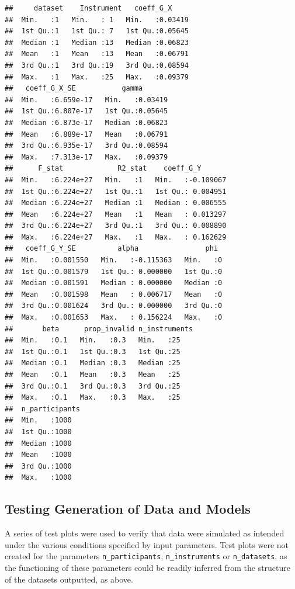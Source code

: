 \documentclass[
]{article}
\begin{document}
\begin{verbatim}
##     dataset    Instrument   coeff_G_X      
##  Min.   :1   Min.   : 1   Min.   :0.03419  
##  1st Qu.:1   1st Qu.: 7   1st Qu.:0.05645  
##  Median :1   Median :13   Median :0.06823  
##  Mean   :1   Mean   :13   Mean   :0.06791  
##  3rd Qu.:1   3rd Qu.:19   3rd Qu.:0.08594  
##  Max.   :1   Max.   :25   Max.   :0.09379  
##   coeff_G_X_SE           gamma        
##  Min.   :6.659e-17   Min.   :0.03419  
##  1st Qu.:6.807e-17   1st Qu.:0.05645  
##  Median :6.873e-17   Median :0.06823  
##  Mean   :6.889e-17   Mean   :0.06791  
##  3rd Qu.:6.935e-17   3rd Qu.:0.08594  
##  Max.   :7.313e-17   Max.   :0.09379  
##      F_stat             R2_stat    coeff_G_Y        
##  Min.   :6.224e+27   Min.   :1   Min.   :-0.109067  
##  1st Qu.:6.224e+27   1st Qu.:1   1st Qu.: 0.004951  
##  Median :6.224e+27   Median :1   Median : 0.006555  
##  Mean   :6.224e+27   Mean   :1   Mean   : 0.013297  
##  3rd Qu.:6.224e+27   3rd Qu.:1   3rd Qu.: 0.008890  
##  Max.   :6.224e+27   Max.   :1   Max.   : 0.162629  
##   coeff_G_Y_SE          alpha                phi   
##  Min.   :0.001550   Min.   :-0.115363   Min.   :0  
##  1st Qu.:0.001579   1st Qu.: 0.000000   1st Qu.:0  
##  Median :0.001591   Median : 0.000000   Median :0  
##  Mean   :0.001598   Mean   : 0.006717   Mean   :0  
##  3rd Qu.:0.001624   3rd Qu.: 0.000000   3rd Qu.:0  
##  Max.   :0.001653   Max.   : 0.156224   Max.   :0  
##       beta      prop_invalid n_instruments
##  Min.   :0.1   Min.   :0.3   Min.   :25   
##  1st Qu.:0.1   1st Qu.:0.3   1st Qu.:25   
##  Median :0.1   Median :0.3   Median :25   
##  Mean   :0.1   Mean   :0.3   Mean   :25   
##  3rd Qu.:0.1   3rd Qu.:0.3   3rd Qu.:25   
##  Max.   :0.1   Max.   :0.3   Max.   :25   
##  n_participants
##  Min.   :1000  
##  1st Qu.:1000  
##  Median :1000  
##  Mean   :1000  
##  3rd Qu.:1000  
##  Max.   :1000
\end{verbatim}

\newpage

\subsection{Testing Generation of Data and Models}\label{appendix-sim-test}

A series of test plots were used to verify that data were simulated as intended under the various conditions specified by input parameters. Test plots were not created for the parameters \texttt{n\_participants}, \texttt{n\_instruments} or \texttt{n\_datasets}, as the functioning of these parameters could be readily inferred from the structure of the datasets outputted, as above.
\end{document}

